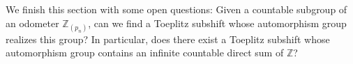 \documentclass{daj}
\theoremstyle{plain}
\theoremstyle{definition}
\begin{document}
We finish this section with some open questions: Given a countable subgroup of an odometer $\mathbb{Z}_{(p_n)}$, can we find a Toeplitz subshift whose automorphism group realizes this group?  In particular, does there exist a Toeplitz subshift whose automorphism group contains an infinite countable direct sum of $\mathbb{Z}$?





\end{document}
